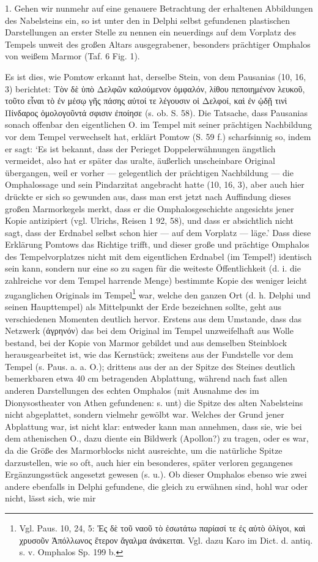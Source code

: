\documentclass[a4paper, 11pt, oneside]{article}
\begin{document}
1. Gehen wir nunmehr auf eine genauere Betrachtung der erhaltenen Abbildungen des Nabelsteins ein, so ist unter den in Delphi selbst gefundenen plastischen Darstellungen an erster Stelle zu nennen ein neuerdings auf dem Vorplatz des Tempels unweit des großen Altars ausgegrabener, besonders prächtiger Omphalos von weißem Marmor (Taf. 6 Fig. 1).

Es ist dies, wie Pomtow erkannt hat, derselbe Stein, von dem Pausanias (10, 16, 3) berichtet: Τὸν δὲ ὑπὸ Δελφῶν καλούμενον ὀμφαλόν, λίθου πεποιημένον λευκοῦ, τοῦτο εἶναι τὸ ἐν μέσῳ γῆς πάσης αὐτοί τε λέγουσιν οἱ Δελφοί, καὶ ἐν ᾠδῇ τινὶ Πίνδαρος ὁμολογοῦντά σφισιν ἐποίησε (s. ob. S. 58). Die Tatsache, dass Pausanias sonach offenbar den eigentlichen O. im Tempel mit seiner prächtigen Nachbildung vor dem Tempel verwechselt hat, erklärt Pomtow (S. 59 f.) scharfsinnig so, indem er sagt: `Es ist bekannt, dass der Perieget Doppelerwähnungen ängstlich vermeidet, also hat er später das uralte, äußerlich unscheinbare Original übergangen, weil er vorher --- gelegentlich der prächtigen Nachbildung --- die Omphalossage und sein Pindarzitat angebracht hatte (10, 16, 3), aber auch hier drückte er sich so gewunden aus, dass man erst jetzt nach Auffindung dieses großen Marmorkegels merkt, dass er die Omphalosgeschichte angesichts jener Kopie antizipiert (vgl. Ulrichs, Reisen 1 92, 58), und dass er absichtlich nicht sagt, dass der Erdnabel selbst schon hier --- auf dem Vorplatz --- läge.' Dass diese Erklärung Pomtows das Richtige trifft, und dieser große und prächtige Omphalos des Tempelvorplatzes nicht mit dem eigentlichen Erdnabel (im Tempel!) identisch sein kann, sondern nur eine so zu sagen für die weiteste Öffentlichkeit (d. i. die zahlreiche vor dem Tempel harrende Menge) bestimmte Kopie des weniger leicht zuganglichen Originals im Tempel\footnote{Vgl. Paus. 10, 24, 5: Ἐς δὲ τοῦ ναοῦ τὸ ἐσωτάτω παρίασί τε ἐς αὐτὸ ὀλίγοι, καὶ χρυσοῦν Ἀπόλλωνος ἕτερον ἄγαλμα ἀνάκειται. Vgl. dazu Karo im Dict. d. antiq. s. v. Omphalos Sp. 199 b.} war, welche den ganzen Ort (d. h. Delphi und seinen Haupttempel) als Mittelpunkt der Erde bezeichnen sollte, geht aus verschiedenen Momenten deutlich hervor. Erstens aus dem Umstande, dass das Netzwerk (ἀγρηνόν) das bei dem Original im Tempel unzweifelhaft aus Wolle bestand, bei der Kopie von Marmor gebildet und aus demselben Steinblock herausgearbeitet ist, wie das Kernstück; zweitens aus der Fundstelle vor dem Tempel (s. Paus. a. a. O.); drittens aus der an der Spitze des Steines deutlich bemerkbaren etwa 40 cm betragenden Abplattung, während nach fast allen anderen Darstellungen des echten Omphalos (mit Ausnahme des im Dionysostheater von Athen gefundenen: s. unt) die Spitze des alten Nabelsteins nicht abgeplattet, sondern vielmehr gewölbt war. Welches der Grund jener Abplattung war, ist nicht klar: entweder kann man annehmen, dass sie, wie bei dem athenischen O., dazu diente ein Bildwerk (Apollon?) zu tragen, oder es war, da die Größe des Marmorblocks nicht ausreichte, um die natürliche Spitze darzustellen, wie so oft, auch hier ein besonderes, später verloren gegangenes Ergänzungsstück angesetzt gewesen (s. u.). Ob dieser Omphalos ebenso wie zwei andere ebenfalls in Delphi gefundene, die gleich zu erwähnen sind, hohl war oder nicht, lässt sich, wie mir 
\end{document}
